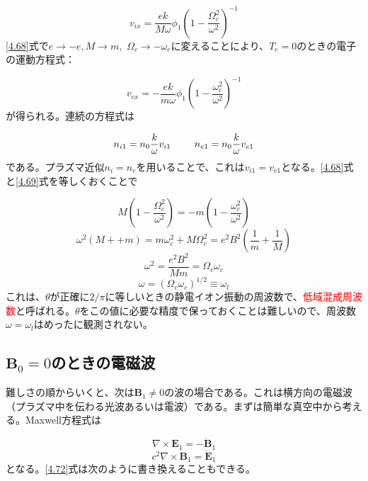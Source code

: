 \documentclass{ltjsarticle}
\numberwithin{equation}{section} %
\begin{document}
\begin{equation}
  v_{ix} = \frac{ek}{M\omega}\phi_1\left(1 - \frac{\Omega^2_c}{\omega^2}\right)^{-1} \label{4.68}
\end{equation}
\eqref{4.68}式で$e \to -e$,\,$M \to m$,\, $\Omega_c \to -\omega_c$に変えることにより、$T_e=0$のときの電子の運動方程式：

\begin{equation}
  v_{ex} = -\frac{ek}{m\omega}\phi_1\left(1 - \frac{\omega^2_c}{\omega^2}\right)^{-1} \label{4.69}
\end{equation}
が得られる。連続の方程式は

\begin{equation}
  n_{i1} = n_0\frac{k}{\omega}v_{i1} \hspace{2pc} n_{e1} = n_0\frac{k}{\omega}v_{e1} \label{4.70}
\end{equation}
である。プラズマ近似$n_i =n_e$を用いることで、これは$v_{i1} = v_{e1}$となる。\eqref{4.68}式と\eqref{4.69}式を等しくおくことで

\[
  M\left(1 - \frac{\Omega^2_c}{\omega^2}\right) = -m\left(1 - \frac{\omega^2_c}{\omega^2}\right)
\]
\[
  \omega^2(M++m) = m\omega^2_c + M\Omega^2_c = e^2B^2\left(\frac{1}{m} + \frac{1}{M}\right)
\]
\[
  \omega^2 = \frac{e^2B^2}{Mm} = \Omega_c \omega_c
\]
\begin{equation}
  \boxed{\omega = (\Omega_c \omega_c)^{1/2} \equiv \omega_l} \label{4.71}
\end{equation}
これは、$\theta$が正確に$2/\pi$に等しいときの静電イオン振動の周波数で、\textcolor{red}{低域混成周波数}と呼ばれる。$\theta$をこの値に必要な精度で保っておくことは難しいので、周波数$\omega = \omega_l$はめったに観測されない。


\subsection{\texorpdfstring{$\bm{B}_0=0$}{B0=0}のときの電磁波} \label{section4.12}
難しさの順からいくと、次は$\bm{B}_1 \neq 0$の波の場合である。これは横方向の電磁波（プラズマ中を伝わる光波あるいは電波）である。まずは簡単な真空中から考える。Maxwell方程式は

\begin{equation}
  \nabla \times \bm{E}_1 = -\dot{\bm{B}}_1 \label{4.72}
\end{equation}
\begin{equation}
  c^2\nabla \times \bm{B}_1 = \dot{\bm{E}}_1 \label{4.73}
\end{equation}
となる。\eqref{4.72}式は次のように書き換えることもできる。
\end{document}
